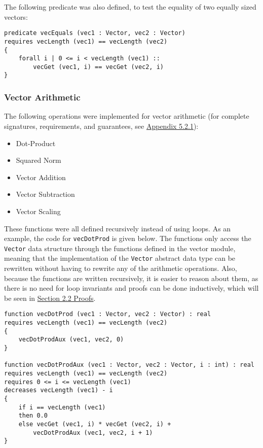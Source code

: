 \documentclass[12pt]{article}
\begin{document}
The following predicate was also defined, to test the equality of two equally sized vectors:

\begin{verbatim}
predicate vecEquals (vec1 : Vector, vec2 : Vector)
requires vecLength (vec1) == vecLength (vec2)
{
    forall i | 0 <= i < vecLength (vec1) ::
        vecGet (vec1, i) == vecGet (vec2, i)
}
\end{verbatim}

\subsubsection{Vector Arithmetic}
The following operations were implemented for vector arithmetic (for complete signatures, requirements, and guarantees, see \hyperref[sec:vectorsigs]{Appendix 5.2.1}):
\begin{itemize}
\item Dot-Product
\item Squared Norm
\item Vector Addition
\item Vector Subtraction
\item Vector Scaling
\end{itemize}

These functions were all defined recursively instead of using loops. As an example, the code for \verb|vecDotProd| is given below. The functions only access the \verb|Vector| data structure through the functions defined in the vector module, meaning that the implementation of the \verb|Vector| abstract data type can be rewritten without having to rewrite any of the arithmetic operations. Also, because the functions are written recursively, it is easier to reason about them, as there is no need for loop invariants and proofs can be done inductively, which will be seen in \hyperref[sec:proofs]{Section 2.2 Proofs}.

\begin{verbatim}
function vecDotProd (vec1 : Vector, vec2 : Vector) : real
requires vecLength (vec1) == vecLength (vec2)
{
    vecDotProdAux (vec1, vec2, 0)
}

function vecDotProdAux (vec1 : Vector, vec2 : Vector, i : int) : real
requires vecLength (vec1) == vecLength (vec2)
requires 0 <= i <= vecLength (vec1)
decreases vecLength (vec1) - i
{
    if i == vecLength (vec1)
    then 0.0
    else vecGet (vec1, i) * vecGet (vec2, i) +
        vecDotProdAux (vec1, vec2, i + 1)
}
\end{verbatim}
\end{document}
